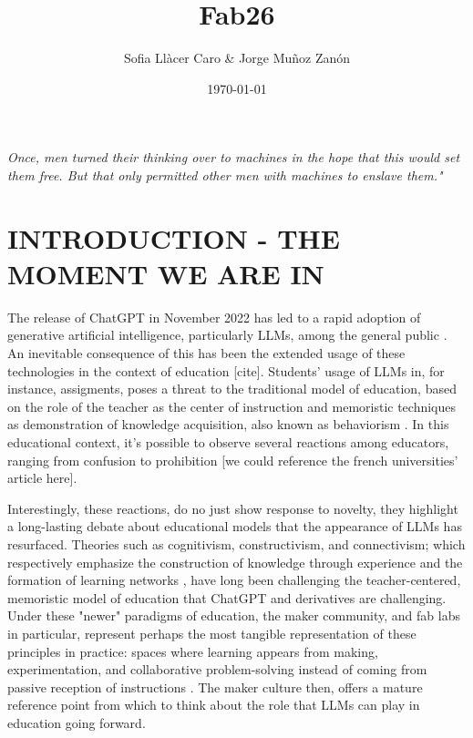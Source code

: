 \documentclass{article}
\title{Fab26}
\author{Sofia Llàcer Caro \& Jorge Muñoz Zanón}
\date{\today}
\begin{document}
\maketitle


\maketitle
\textit{Once, men turned their thinking over to machines in the hope that this would set them free. But that only permitted other men with machines to enslave them."} \cite{herbert1965dune}



\section{INTRODUCTION - THE MOMENT WE ARE IN}

The release of ChatGPT in November 2022 has led to a rapid adoption of generative artificial intelligence, particularly LLMs, among the general public \cite{chatgptrelease}. An inevitable consequence of this has been the extended usage of these technologies in the context of education [cite]. Students' usage of LLMs in, for instance, assigments, poses a threat to the traditional model of education, based on the role of the teacher as the center of instruction and memoristic techniques as demonstration of knowledge acquisition, also known as behaviorism \cite{ertmer1993conductismo}. In this educational context, it's possible to observe several reactions among educators, ranging from confusion to prohibition [we could reference the french universities' article here]. 

Interestingly, these reactions, do no just show response to novelty, they highlight a long-lasting debate about educational models that the appearance of LLMs has resurfaced. Theories such as cognitivism, constructivism, and connectivism; which respectively emphasize the construction of knowledge through experience and the formation of learning networks \cite{gortaire2022constructivismo}\cite{gutierrez2012conectivismo}, have long been challenging the teacher-centered, memoristic model of education that ChatGPT and derivatives are challenging. Under these "newer" paradigms of education, the maker community, and fab labs in particular, represent perhaps the most tangible representation of these principles in practice: spaces where learning appears from making, experimentation, and collaborative problem-solving instead of coming from passive reception of instructions \cite{gershenfeld2005fab}\cite{gershenfeld2017designing}. The maker culture then, offers a mature reference point from which to think about the role that LLMs can play in education going forward. 
\end{document}
